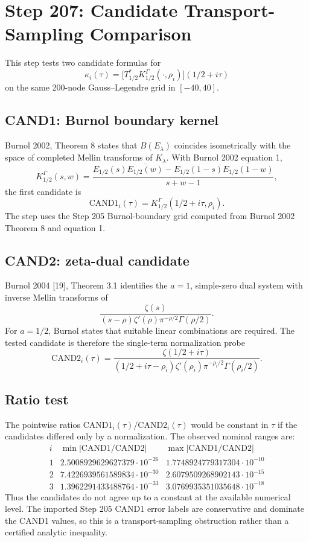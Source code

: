 \documentclass[11pt]{article}
\begin{document}
\section*{Step 207: Candidate Transport-Sampling Comparison}

This step tests two candidate formulas for
\[
  \kappa_i(\tau)=\bigl[T_{1/2}^*K_{1/2}^{\Gamma}(\cdot,\rho_i)\bigr](1/2+i\tau)
\]
on the same 200-node Gauss--Legendre grid in \([-40,40]\).

\subsection*{CAND1: Burnol boundary kernel}

Burnol 2002, Theorem 8 states that \(B(E_\lambda)\) coincides isometrically
with the space of completed Mellin transforms of \(K_\lambda\).  With Burnol
2002 equation 1,
\[
 K_{1/2}^{\Gamma}(s,w)=
 \frac{E_{1/2}(s)\overline{E_{1/2}(w)}
       -E_{1/2}(1-s)\overline{E_{1/2}(1-w)}}{s+w-1},
\]
the first candidate is
\[
  \mathrm{CAND1}_i(\tau)=K_{1/2}^{\Gamma}(1/2+i\tau,\rho_i).
\]
The step uses the Step 205 Burnol-boundary grid computed from Burnol 2002
Theorem 8 and equation 1.

\subsection*{CAND2: zeta-dual candidate}

Burnol 2004 [19], Theorem 3.1 identifies the \(a=1\), simple-zero dual system
with inverse Mellin transforms of
\[
 \frac{\zeta(s)}{(s-\rho)\zeta'(\rho)\pi^{-\rho/2}\Gamma(\rho/2)}.
\]
For \(a=1/2\), Burnol states that suitable linear combinations are required.
The tested candidate is therefore the single-term normalization probe
\[
  \mathrm{CAND2}_i(\tau)=
  \frac{\zeta(1/2+i\tau)}
  {(1/2+i\tau-\rho_i)\zeta'(\rho_i)\pi^{-\rho_i/2}\Gamma(\rho_i/2)}.
\]

\subsection*{Ratio test}

The pointwise ratios \(\mathrm{CAND1}_i(\tau)/\mathrm{CAND2}_i(\tau)\)
would be constant in \(\tau\) if the candidates differed only by a
normalization.  The observed nominal ranges are:
\[
\begin{array}{c|c|c}
i & \min |\mathrm{CAND1}/\mathrm{CAND2}| & \max |\mathrm{CAND1}/\mathrm{CAND2}|\\
\hline
1 & 2.5008929629627379\cdot10^{-26} & 1.7748924779317304\cdot10^{-10}\\
2 & 7.4226939561589834\cdot10^{-30} & 2.6079509268902143\cdot10^{-15}\\
3 & 1.3962291433488764\cdot10^{-33} & 3.0769935351035648\cdot10^{-18}
\end{array}
\]
Thus the candidates do not agree up to a constant at the available numerical
level.  The imported Step 205 CAND1 error labels are conservative and dominate
the CAND1 values, so this is a transport-sampling obstruction rather than a
certified analytic inequality.
\end{document}
